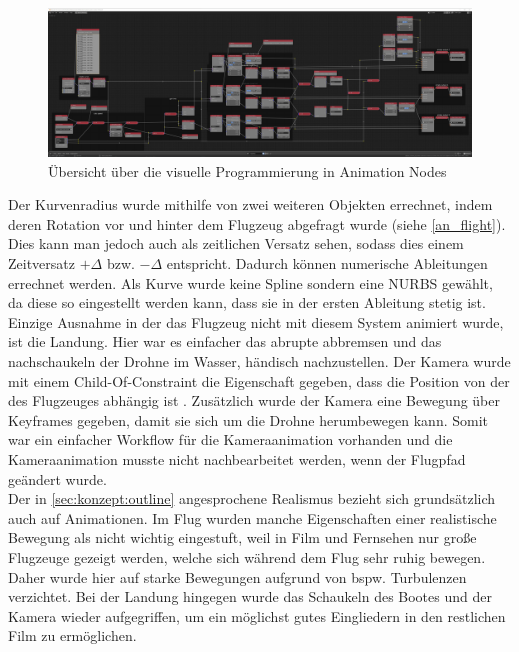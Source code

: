 \begin{figure}[H]
\begin{center}
\includegraphics[width=\textwidth]{gfx/prod/plane/animation_nodes.jpg}
\caption{Übersicht über die visuelle Programmierung in Animation Nodes}
\label{animation_nodes}
\end{center}
\end{figure}

Der Kurvenradius wurde mithilfe von zwei weiteren Objekten errechnet, indem deren Rotation vor und hinter dem Flugzeug abgefragt wurde (siehe \autoref{an_flight}). Dies kann man jedoch auch als zeitlichen Versatz sehen, sodass dies einem Zeitversatz $ +\Delta $ bzw. $ -\Delta $ entspricht. Dadurch können numerische Ableitungen errechnet werden.
Als Kurve wurde keine Spline sondern eine NURBS gewählt, da diese so eingestellt werden kann, dass sie in der ersten Ableitung stetig ist. Einzige Ausnahme in der das Flugzeug nicht mit diesem System animiert wurde, ist die Landung. Hier war es einfacher das abrupte abbremsen und das nachschaukeln der Drohne im Wasser, händisch nachzustellen.
Der Kamera wurde mit einem Child-Of-Constraint die Eigenschaft gegeben, dass die Position von der des Flugzeuges abhängig ist . Zusätzlich wurde der Kamera eine Bewegung über Keyframes gegeben, damit sie sich um die Drohne herumbewegen kann. Somit war ein einfacher Workflow für die Kameraanimation vorhanden und die Kameraanimation musste nicht nachbearbeitet werden, wenn der Flugpfad geändert wurde.\\

Der in \autoref{sec:konzept:outline} angesprochene Realismus bezieht sich grundsätzlich auch auf Animationen. Im Flug wurden manche Eigenschaften einer realistische Bewegung als nicht wichtig eingestuft, weil in Film und Fernsehen nur große Flugzeuge gezeigt werden, welche sich während dem Flug sehr ruhig bewegen. Daher wurde hier auf starke Bewegungen aufgrund von bspw. Turbulenzen verzichtet. Bei der Landung hingegen wurde das Schaukeln des Bootes und der Kamera wieder aufgegriffen, um ein möglichst gutes Eingliedern in den restlichen Film zu ermöglichen.

